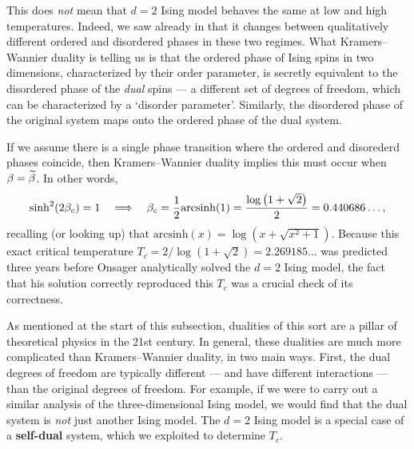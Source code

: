 This does \textit{not} mean that $d = 2$ Ising model behaves the same at low and high temperatures.
Indeed, we saw already in  that it changes between qualitatively different ordered and disordered phases in these two regimes.
What Kramers--Wannier duality is telling us is that the ordered phase of Ising spins in two dimensions, characterized by their order parameter, is secretly equivalent to the disordered phase of the \textit{dual} spins --- a different set of degrees of freedom, which can be characterized by a `disorder parameter'.
Similarly, the disordered phase of the original system maps onto the ordered phase of the dual system.

If we assume there is a single phase transition where the ordered and disorederd phases coincide, then Kramers--Wannier duality implies this must occur when $\beta = \widetilde{\beta}$.
In other words,
\begin{equation*}
  \sinh^2(2\beta_c) = 1 \quad \Longrightarrow \quad \beta_c = \frac{1}{2} \mathrm{arcsinh}(1) = \frac{\log\left(1 + \sqrt{2}\right)}{2} = 0.440686\dots,
\end{equation*}
recalling (or looking up) that $\mathrm{arcsinh}(x) = \log\left(x + \sqrt{x^2 + 1}\right)$.
Because this exact critical temperature $T_c = 2 / \log\left(1 + \sqrt{2}\right) = 2.269185\dots$ was predicted three years before Onsager analytically solved the $d = 2$ Ising model, the fact that his solution correctly reproduced this $T_c$ was a crucial check of its correctness.

As mentioned at the start of this subsection, dualities of this sort are a pillar of theoretical physics in the 21st century.
In general, these dualities are much more complicated than Kramers--Wannier duality, in two main ways.
First, the dual degrees of freedom are typically different --- and have different interactions --- than the original degrees of freedom.
For example, if we were to carry out a similar analysis of the three-dimensional Ising model, we would find that the dual system is \textit{not} just another Ising model. %
The $d = 2$ Ising model is a special case of a \textbf{self-dual} system, which we exploited to determine $T_c$.

